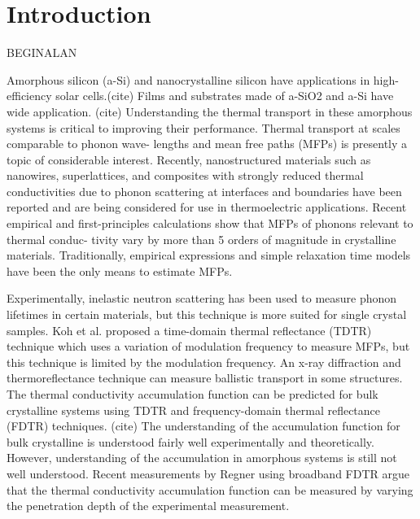 \documentclass[aps,prb,onecolumn,preprint,superscriptaddress,footinbib,amsmath,amssymb,floatfix]{revtex4}
\begin{document}
\section{\label{S:Introduction}Introduction}

BEGINALAN

Amorphous silicon (a-Si) and nanocrystalline silicon have applications 
in high-efficiency solar cells.(cite) 
Films and substrates made of a-SiO2 and a-Si have wide application.
(cite) Understanding the thermal transport in these amorphous systems 
is critical to improving their performance. 
Thermal transport at scales comparable to phonon wave-
lengths and mean free paths (MFPs) is presently a topic of
considerable interest.\cite{cahill_nanoscale_2003,
yu_reduction_2010,hochbaum_enhanced_2008,pernot_precise_2010}
Recently, nanostructured materials
such as nanowires, superlattices, and composites with
strongly reduced thermal conductivities due to phonon
scattering at interfaces and boundaries have been reported
and are being considered for use in thermoelectric applications.
\cite{hochbaum_enhanced_2008,pernot_precise_2010,
boukai_silicon_2008,poudel_high-thermoelectric_2008}
Recent empirical and first-principles calculations
show that MFPs of phonons relevant to thermal conduc-
tivity vary by more than 5 orders of magnitude in crystalline 
materials.\cite{ward_intrinsic_2010}
Traditionally, empirical expressions and
simple relaxation time models have been the only means
to estimate MFPs.\cite{holland_analysis_1963} 

Experimentally, inelastic neutron scattering has been
used to measure phonon lifetimes in certain materials,
but this technique is more suited for single crystal samples.
\cite{christianson_phonon_2008} 
Koh et al. proposed a time-domain thermal reflectance (TDTR) 
technique which uses a variation of
modulation frequency to measure MFPs, but this technique
is limited by the modulation frequency.
\cite{koh_frequency_2007}
An x-ray diffraction and thermoreflectance technique
can measure ballistic transport in some structures.
\cite{highland_ballistic-phonon_2007}
The thermal conductivity accumulation function can be 
predicted for bulk crystalline systems using TDTR and 
frequency-domain thermal reflectance (FDTR) techniques.
(cite) 
The understanding of the accumulation function for bulk 
crystalline is understood fairly well experimentally
\cite{minnich_thermal_2011}
and 
theoretically.\cite{yang_mean_2013} However, understanding 
of the accumulation in amorphous systems is still not 
well understood.
\cite{feldman_thermal_1993,cahill_thermal_1994,
feldman_numerical_1999,liu_high_2009,yang_anomalously_2010,
he_thermal_2011}
Recent measurements by Regner using broadband FDTR 
argue that the thermal conductivity accumulation function 
can be measured by varying the penetration depth of the 
experimental measurement.\cite{regner_broadband_2013}
\end{document}
